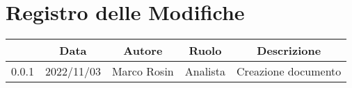 \thispagestyle{empty}

\section*{Registro delle Modifiche}

\begin{center}
    \renewcommand{\arraystretch}{1.8}
    \begin{longtable}[c]{c | c | c | c | p{5cm}}
        \rowcolor[HTML]{444444}
        \multicolumn{1}{c}{\color[HTML]{FFFFFF} \textbf{Versione}} &
        \multicolumn{1}{c}{\color[HTML]{FFFFFF} \textbf{Data}}     &
        \multicolumn{1}{c}{\color[HTML]{FFFFFF} \textbf{Autore}}   &
        \multicolumn{1}{c}{\color[HTML]{FFFFFF} \textbf{Ruolo}}    &
        \multicolumn{1}{c}{\color[HTML]{FFFFFF} \textbf{Descrizione}}                                                          \\
        \endhead

        0.0.1                                                      & 2022/11/03 & Marco Rosin & Analista & Creazione documento \\
    \end{longtable}
\end{center}